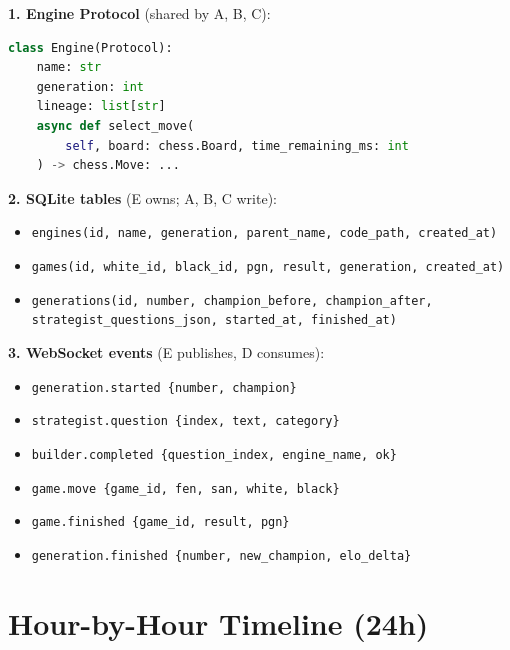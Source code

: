 \documentclass[11pt]{article}
\begin{document}
\textbf{1. Engine Protocol} (shared by A, B, C):
\begin{lstlisting}[language=Python]
class Engine(Protocol):
    name: str
    generation: int
    lineage: list[str]
    async def select_move(
        self, board: chess.Board, time_remaining_ms: int
    ) -> chess.Move: ...
\end{lstlisting}

\textbf{2. SQLite tables} (E owns; A, B, C write):
\begin{itemize}[leftmargin=*]
    \item \texttt{engines(id, name, generation, parent\_name, code\_path, created\_at)}
    \item \texttt{games(id, white\_id, black\_id, pgn, result, generation, created\_at)}
    \item \texttt{generations(id, number, champion\_before, champion\_after, strategist\_questions\_json, started\_at, finished\_at)}
\end{itemize}

\textbf{3. WebSocket events} (E publishes, D consumes):
\begin{itemize}[leftmargin=*]
    \item \texttt{generation.started \{number, champion\}}
    \item \texttt{strategist.question \{index, text, category\}}
    \item \texttt{builder.completed \{question\_index, engine\_name, ok\}}
    \item \texttt{game.move \{game\_id, fen, san, white, black\}}
    \item \texttt{game.finished \{game\_id, result, pgn\}}
    \item \texttt{generation.finished \{number, new\_champion, elo\_delta\}}
\end{itemize}

\section{Hour-by-Hour Timeline (24h)}
\end{document}
